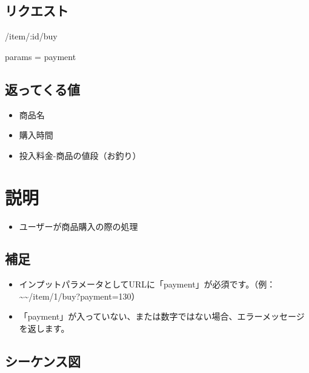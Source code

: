 \documentclass[letterpaper,10pt,dvipdfmx]{sphinxmanual}
\begin{document}
\subsection{リクエスト}
\label{\detokenize{user/buy:id2}}
/item/:id/buy

params = payment


\subsection{返ってくる値}
\label{\detokenize{user/buy:id3}}\begin{itemize}
\item {} 
商品名

\item {} 
購入時間

\item {} 
投入料金-商品の値段（お釣り）

\end{itemize}


\section{説明}
\label{\detokenize{user/buy:id4}}\begin{itemize}
\item {} 
ユーザーが商品購入の際の処理

\end{itemize}


\subsection{補足}
\label{\detokenize{user/buy:id5}}\begin{itemize}
\item {} 
インプットパラメータとしてURLに「payment」が必須です。（例：\textasciitilde{}\textasciitilde{}/item/1/buy?payment=130）

\item {} 
「payment」が入っていない、または数字ではない場合、エラーメッセージを返します。

\end{itemize}


\subsection{シーケンス図}
\label{\detokenize{user/buy:id6}}
\noindent{}

\begin{DUlineblock}{0em}
\item[] 
\end{DUlineblock}
\end{document}
